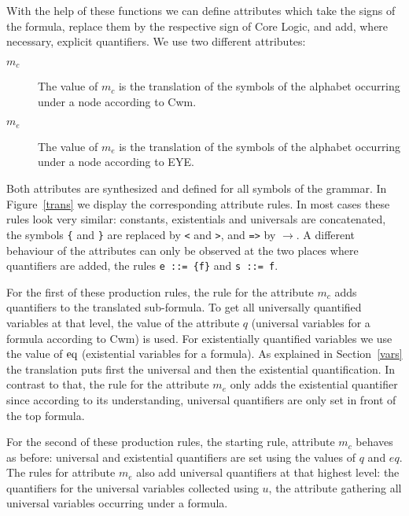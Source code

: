 With the help of these functions we can define attributes which take the signs of the \nthree formula, 
replace them by the respective sign of \nthree Core Logic,
and add, where necessary, explicit quantifiers.  We use two different attributes:
\begin{description}
 \item[$m_c$] The value of $m_c$ is the translation of the symbols of the alphabet occurring under a node according to Cwm. 
  \item[$m_e$] The value of $m_e$ is the translation of the symbols of the alphabet occurring under a node according to EYE.
\end{description}
Both attributes are synthesized and defined for all symbols of the grammar. In Figure~\ref{trans} we display the corresponding attribute rules. In most cases these 
rules look very similar: constants, existentials and universals are concatenated, the symbols \texttt{\{} and \texttt{\}} are replaced by \texttt{<} and \texttt{>}, and \texttt{=>}
by $\rightarrow$. 
A different behaviour of the attributes can only be observed at the two places where quantifiers are added, the rules \texttt{e~::=~\{f\}} and \texttt{s~::=~f}.

For the first of these production rules, the rule for the attribute $m_c$ adds quantifiers to the translated sub-formula. 
To get all universally quantified variables at that level, the value of the attribute $q$ (universal variables for a formula according to 
Cwm) is used. 
For existentially quantified variables  we use the value of $\text{eq}$ (existential variables for a formula).
As explained in Section~\ref{vars} the translation puts first the universal and then the existential quantification.
In contrast to that, the rule for the attribute $m_e$ only adds the existential quantifier since according to its understanding, 
universal quantifiers are only set in front of the top formula. 

For the second of these production rules, the starting rule, attribute $m_c$ behaves as before: universal and existential quantifiers are set using the values of $q$ and $eq$. 
The rules for attribute $m_e$ also add universal quantifiers at that highest level: the quantifiers for the universal variables collected using $u$, the attribute gathering 
all universal variables occurring under a formula. 

